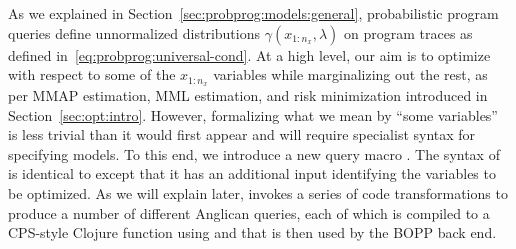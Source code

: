 
As we explained in Section~\ref{sec:probprog:models:general}, probabilistic program queries
define unnormalized distributions $\gamma(x_{1:n_x},\lambda)$ on program traces
 as defined in~\eqref{eq:probprog:universal-cond}.
At a high level, our aim is to optimize with respect to some of the $x_{1:n_x}$ variables while marginalizing out
the rest, as per MMAP estimation, MML estimation, and risk minimization introduced in
Section~\ref{sec:opt:intro}.
However, formalizing what we mean by ``some variables'' is less trivial than it would
first appear and will require specialist syntax for specifying models.  To this end,
we introduce a new query macro .  The syntax of  is identical to  except 
that it has an additional input identifying the variables to be optimized.  As we will
explain later,  invokes a series of code transformations to produce a number
of different Anglican queries, each of which is compiled to a CPS-style Clojure function using
\query and that is then used by the BOPP back end.

